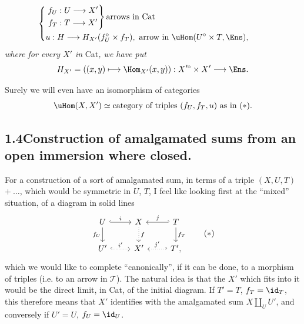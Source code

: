 
\[
\left\{
\begin{aligned}
&\left.\begin{aligned} f_U &: U \longrightarrow X' \\ f_T &: T \longrightarrow X' \end{aligned}\right\}\text{arrows in Cat}\\
&u : H \longrightarrow H_{X'}(f_U^{\circ}\times f_T),\ \text{arrow in } \uHom(U^{\circ}\times T,\Ens),
\end{aligned}
\right.
\tag*{}
\]
\textit{where for every $X'$ in} Cat\textit{, we have put}
\[
H_{X'} = ((x,y)\longmapsto \Hom_{X'}(x,y)) : X'^{\circ}\times X' \longrightarrow \Ens.
\]

Surely we will even have an isomorphism of categories
\[
\uHom(X,X') \simeq \text{category of triples } (f_U,f_T,u) \text{ as in } (*).
\]

\subsection*{1.4\quad Construction of amalgamated sums from an open immersion where closed.} %

For a construction of a sort of amalgamated sum, in terms of a triple $(X,U,T)$ $+\ \ldots$,  which would be symmetric in $U$, $T$, I feel like looking first at the ``mixed'' situation, of a diagram in solid lines
\[
\begin{tikzcd}
U \arrow[r, hook, "i"] \arrow[d, "f_U"'] & X \arrow[d, dotted, "f"] & T \arrow[l, hook', "j"'] \arrow[d, "f_T"] \\
U' \arrow[r, hook, dotted, "i'"] & X' & T', \arrow[l, hook', dotted, "j'"']
\end{tikzcd}
\tag*{$(*)$}
\]
which we would like to complete ``canonically'', if it can be done, to a morphism of triples (i.e. to an arrow in $\mathcal{T}$). The natural idea is that the $X'$ which fits into it would be the direct limit, in Cat, of the initial diagram. If $T'=T$, $f_T=\id_T$, this therefore means that $X'$ identifies with the amalgamated sum $X\amalg_U U'$, and conversely if $U'=U$, $f_U=\id_U$.

